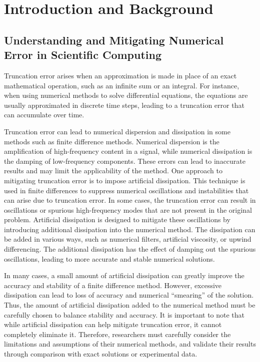 \documentclass[a4paper]{report}
\begin{document}
\section{Introduction and Background}
\subsection{Understanding and Mitigating Numerical Error in Scientific Computing}
Truncation error arises when an approximation
is made in place of an exact mathematical operation, such as an infinite sum or
an integral. For instance, when using numerical methods to solve differential
equations, the equations are usually approximated in discrete time steps, leading
to a truncation error that can accumulate over time.

Truncation error can lead to numerical dispersion and dissipation in some methods
such as finite difference methods. Numerical dispersion is the amplification of
high-frequency content in a signal, while numerical dissipation is the damping
of low-frequency components. These errors can lead to inaccurate results and may
limit the applicability of the method. One approach to mitigating truncation error
is to impose artificial dissipation. This technique is used in finite differences
to suppress numerical oscillations and instabilities that can arise due to truncation
error. In some cases, the truncation error can result in oscillations or spurious
high-frequency modes that are not present in the original problem. Artificial
dissipation is designed to mitigate these oscillations by introducing additional
dissipation into the numerical method. The dissipation can be added in various
ways, such as numerical filters, artificial viscosity, or upwind differencing. 
The additional dissipation has the effect of damping out the spurious oscillations,
leading to more accurate and stable numerical solutions.

In many cases, a small amount of artificial dissipation can greatly improve the accuracy
and stability of a finite difference method. However, excessive dissipation can
lead to loss of accuracy and numerical ``smearing'' of the solution. Thus, the
amount of artificial dissipation added to the numerical method must be carefully
chosen to balance stability and accuracy. It is important to note that while artificial
dissipation can help mitigate truncation error, it cannot completely eliminate
it. Therefore, researchers must carefully consider the limitations and assumptions
of their numerical methods, and validate their results through comparison with
exact solutions or experimental data.
\end{document}
